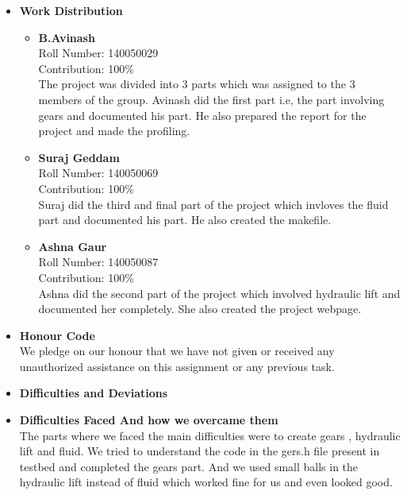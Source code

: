 \documentclass{article}
\begin{document}
\begin{itemize}
	\item[] \textbf{\LARGE Work Distribution} \\
	   \begin{itemize}[label=$\blacksquare$] \vspace{0cm}
           \item \textbf{\Large B.Avinash }\\
           \large Roll Number: 140050029\\ Contribution: 100\% \\ The project was divided into 3 parts which was assigned to the 3 members of the group. Avinash did the first part i.e, the part involving gears and documented his part. He also prepared the report for the project and made the profiling. \vspace{0.2 cm}
           \item \textbf{\Large Suraj Geddam }\\ 
           \large Roll Number: 140050069\\ Contribution: 100\% \\ Suraj did the third and final part of the project which invloves the fluid part and documented his part. He also created the makefile.\vspace{0.2 cm}
           \item \textbf{\Large Ashna Gaur }\\ 
           \large Roll Number: 140050087\\ Contribution: 100\% \\  Ashna did the second part of the project which involved hydraulic lift and documented her completely. She also created the project webpage. \vspace{0.2 cm}
       \end{itemize}
       \item[] \textbf{\LARGE Honour Code} \\ 
       \large We pledge on our honour that we have not given or received any unauthorized assistance on this assignment or any previous task.\\\vspace{0.2 cm}  

	\item[] \textbf{\LARGE Difficulties and Deviations} \\
	\item[] \textbf{\Large Difficulties Faced And how we overcame them} \\
    \large The parts where we faced the main difficulties were to create gears , hydraulic lift and fluid. We tried to understand the code in the gers.h file present in testbed and completed the gears part. And we used small balls in the hydraulic lift instead of fluid which worked fine for us and even looked good.\\ \vspace{0.2 cm}


\end{itemize}
\end{document}

